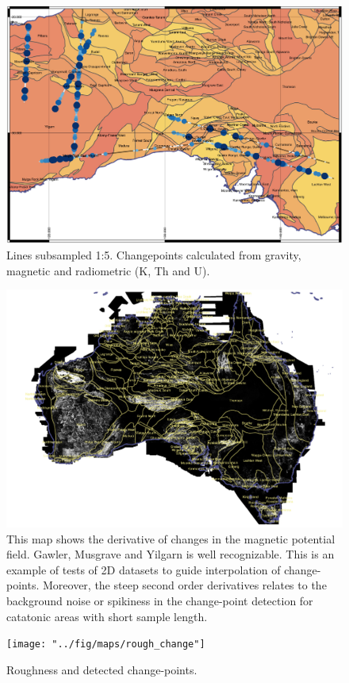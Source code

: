 \begin{figure}
	\centering


\centering
\includegraphics[width=1\linewidth]{"../fig/maps/All lines"}
\caption[Change points for all lines]{Lines subsampled 1:5. Changepoints calculated from gravity, magnetic and radiometric (K, Th and U).}
\label{fig:all-lines}

\end{figure}


\begin{figure}
	\centering
	
	
	\centering
	\includegraphics[width=1\linewidth]{"../fig/maps/slope_of_slope"}
	\caption[Derivate of changes in magnetic potential field.]{This map shows the derivative of changes in the magnetic potential field. Gawler, Musgrave and Yilgarn is well recognizable. This is an example of tests of 2D datasets to guide interpolation of change-points. Moreover, the steep second order derivatives relates to the background noise or spikiness in the change-point detection for catatonic areas with short sample length.}
	\label{fig:slopes}
	
\end{figure}


\begin{figure}
	\centering
	
	\centering
	\texttt{[image: "../fig/maps/rough\_change"]}
	\caption[Derivate of changes in magnetic potential field and suggested changepoints.]{Roughness and detected change-points.}
	\label{fig:slopes_and_change}
	
\end{figure}